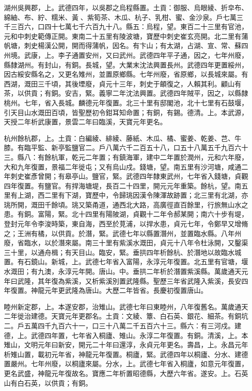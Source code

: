 \begin{pinyinscope}
 湖州吳興郡，上。武德四年，以吳郡之烏程縣置。土貢：御服、烏眼綾、折皁布、綿紬、布、紵、糯米、黃、紫筍茶、木瓜、杭子、乳柑、蜜、金沙泉。戶七萬三千三百六，口四十七萬七千六百九十八。縣五：烏程，望。東百二十三里有官池，元和中刺史範傳正開。東南二十五里有陵波塘，寶歷中刺史崔玄亮開。北二里有蒲帆塘，刺史楊漢公開，開而得蒲帆，因名。有卞山；有太湖，占湖、宣、常、蘇四州境。武康，上。李子通置安州，又曰武州。武德四年平子通，因之，七年州廢，縣隸湖州。有封山，有銅。長城，望。大業末沈法興置長州。武德四年更置綏州，因古綏安縣名之，又更名雉州，並置原鄉縣。七年州廢，省原鄉，以長城來屬。有西湖，溉田三千頃，其後堙廢，貞元十三年，刺史于頔復之，人賴其利。顧山有茶，以供貢；有銅。安吉，緊。義寧二年沈法興置。武德四年賊平，因之，以縣隸桃州。七年，省入長城。麟德元年復置。北三十里有邸閣池，北十七里有石鼓堰，引天目山水溉田百頃，皆聖歷初令鉗耳知命置；有銅，有錫。德清。上。本武源，天授二年析武康置，景雲二年曰臨溪，天寶元年更名。



 杭州餘杭郡，上。土貢：白編綾、緋綾、藤紙、木瓜、橘、蜜姜、乾姜、芑、牛膝。有臨平監、新亭監鹽官二。戶八萬六千二百五十八，口五十八萬五千九百六十三。縣八：有餘杭軍，乾元二年置；有鎮海軍，建中二年置於潤州，元和六年廢，大和九年復置，景福二年徙屯；又有烏山戍。錢塘，望。南五里有沙河塘，咸通二年刺史崔彥曾開；有皋亭山。鹽官，緊。武德四年隸東武州，七年省入錢塘，貞觀四年復置。有鹽官。有捍海塘堤，長百二十四里，開元元年重築。餘杭，望。南五里有上湖，西二里有下湖，寶歷中，令歸珧因漢令陳渾故跡置；北三里有北湖，亦珧所開，溉田千餘頃。珧又築甬道，通西北大路，高廣徑直百餘里，行旅無山水之患。有銅。富陽，緊。北十四里有陽陂湖，貞觀十二年令郝某開；南六十步有堤，登封元年令李浚時築，東自海，西至於莧浦，以捍水患，貞元七年，令鄭早又增脩之；王洲有橘，以供貢。於潛，緊。武德七年以縣置潛州，並置臨水縣。八年州廢，省臨水，以於潛來屬。南三十里有紫溪水溉田，貞元十八年令杜泳開，又鑿渠三十里，以通舟楫；有天目山。臨安，緊。垂拱四年析餘杭、於潛地以故臨水城置。有石鏡山。新城，上。武德七年省入富陽，永淳元年復置。北五里有官塘，堰水溉田；有九澳，永淳元年開。唐山。中。垂拱二年析於潛置紫溪縣。萬歲通天元年曰武隆，其年復為紫溪，又析紫溪別置武隆縣。聖歷三年省武隆入紫溪，長安四年復置。神龍元年更武隆為唐山。大歷二年皆省。長慶初復置唐山。



 睦州新定郡，上。本遂安郡，治雉山。武德七年曰東睦州，八年復舊名。萬歲通天二年徙治建德。天寶元年更郡名。土貢：文綾、簟、白石英、銀花、細茶。有銅坑二。戶五萬四千九百六十一，口三十八萬二千五百六十三。縣六：有三河戍。建德，上。武德四年置，七年省入桐廬、雉山。永淳二年復置。有銅。清溪，上。本雉山，文明元年曰新安，開元二十年曰還淳，永貞元年更名。壽昌，上。永昌元年析雉山置，載初元年省，神龍元年復置。桐廬，緊。武德四年以桐廬、分水、建德置嚴州。七年州廢，以桐廬來屬。分水，上。武德七年省入桐廬，如意元年復置，更名武盛，神龍元年復故名。寶應二年析置昭德縣，大歷六年省。遂安。上。石英山有白石英，以供貢；有銅。




\end{pinyinscope}

